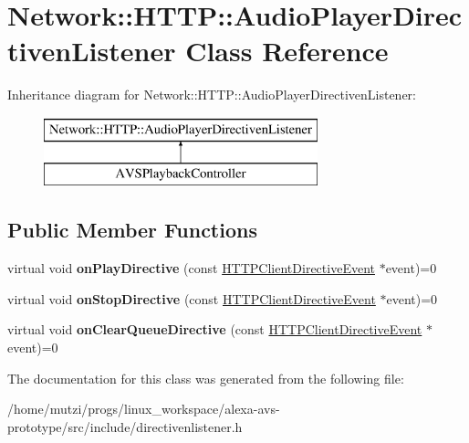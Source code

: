 \hypertarget{classNetwork_1_1HTTP_1_1AudioPlayerDirectivenListener}{}\section{Network\+:\+:H\+T\+TP\+:\+:Audio\+Player\+Directiven\+Listener Class Reference}
\label{classNetwork_1_1HTTP_1_1AudioPlayerDirectivenListener}
Inheritance diagram for Network\+:\+:H\+T\+TP\+:\+:Audio\+Player\+Directiven\+Listener\+:\begin{figure}[H]
\begin{center}
\leavevmode
\includegraphics[height=2.000000cm]{d4/d02/classNetwork_1_1HTTP_1_1AudioPlayerDirectivenListener}
\end{center}
\end{figure}
\subsection*{Public Member Functions}
\begin{DoxyCompactItemize}
\item 
\mbox{\label{classNetwork_1_1HTTP_1_1AudioPlayerDirectivenListener_a4ae61de51ef94365641ea7b330f81062}} 
virtual void {\bfseries on\+Play\+Directive} (const \hyperlink{classNetwork_1_1HTTP_1_1HTTPClientDirectiveEvent}{H\+T\+T\+P\+Client\+Directive\+Event} $\ast$event)=0
\item 
\mbox{\label{classNetwork_1_1HTTP_1_1AudioPlayerDirectivenListener_a80b2a9267bbe821f109d0cc7feb7af92}} 
virtual void {\bfseries on\+Stop\+Directive} (const \hyperlink{classNetwork_1_1HTTP_1_1HTTPClientDirectiveEvent}{H\+T\+T\+P\+Client\+Directive\+Event} $\ast$event)=0
\item 
\mbox{\label{classNetwork_1_1HTTP_1_1AudioPlayerDirectivenListener_a67fed55016da69d39adc936d82099541}} 
virtual void {\bfseries on\+Clear\+Queue\+Directive} (const \hyperlink{classNetwork_1_1HTTP_1_1HTTPClientDirectiveEvent}{H\+T\+T\+P\+Client\+Directive\+Event} $\ast$event)=0
\end{DoxyCompactItemize}


The documentation for this class was generated from the following file\+:\begin{DoxyCompactItemize}
\item 
/home/mutzi/progs/linux\+\_\+workspace/alexa-\/avs-\/prototype/src/include/directivenlistener.\+h\end{DoxyCompactItemize}
